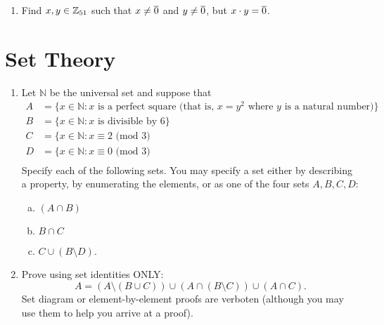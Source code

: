 \begin{enumerate}
\item
Find $x,y \in \mathbb{Z}_{51}$ such that $x \neq \overline{0}$ and $y \neq \overline{0}$, but $x \cdot y = \overline{0}$.


\end{enumerate}


\section{Set Theory}

\begin{enumerate}

\item
Let ${\mathbb N}$ be the universal set and suppose that
\begin{align*}
A &= \{ x \in {\mathbb N} : x \text{ is a perfect square (that is, } x=y^2 \text{ where } y \text{ is a natural number)}\} \\ 
B &= \{ x \in {\mathbb N} : x \text{ is divisible by 6}\} \\ 
C &= \{ x \in {\mathbb N} : x  \equiv 2 \text{ (mod 3)} \\
D &= \{ x \in {\mathbb N} : x  \equiv 0 \text{ (mod 3)} \\
\end{align*} 
Specify each of the following sets. You may specify a set either by describing a property, by enumerating the elements, or as one of the four sets $A, B, C, D$:
\begin{enumerate}[(a)]
\item
$(A \cap B)$
\item
$B \cap C$
\item
$C \cup (B \setminus D)$.
\end{enumerate}



\item
Prove using set identities ONLY:  
\[A = (A\setminus (B\cup C)) \cup (A\cap (B\setminus C)) \cup  (A \cap C).\]    
Set diagram or element-by-element proofs are verboten (although you may use them to help you arrive at a proof).


\end{enumerate}
